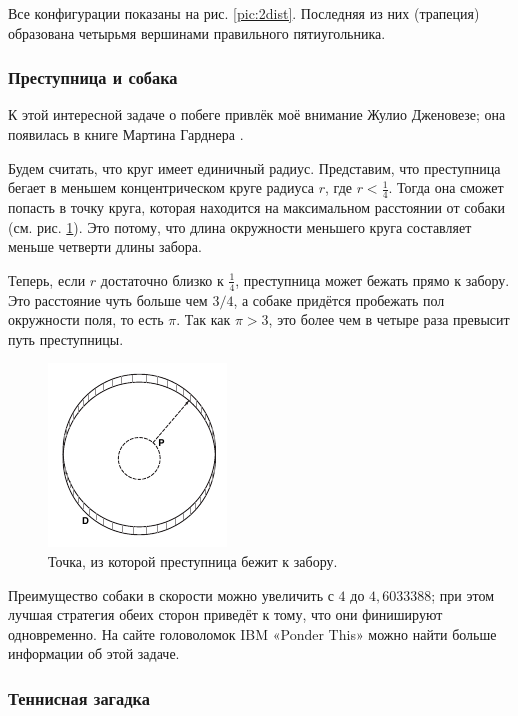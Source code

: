 Все конфигурации показаны на рис. \ref{pic:2dist}.
Последняя из них (трапеция) образована четырьмя вершинами правильного пятиугольника.


\subsubsection*{Преступница и собака}

К этой интересной задаче о побеге привлёк моё внимание Жулио Дженовезе;
она появилась в книге Мартина Гарднера \cite{24}.

Будем считать, что круг имеет единичный радиус.
Представим, что преступница бегает в меньшем концентрическом круге радиуса $r$, где $r < \tfrac14$.
Тогда она сможет попасть в точку круга, которая находится на максимальном расстоянии от собаки (см. рис. \ref{pic:dog}).
Это потому, что длина окружности меньшего круга составляет меньше четверти длины забора.

Теперь, если $r$ достаточно близко к $\tfrac14$, преступница может бежать прямо к забору.
Это расстояние чуть больше чем $3/4$, а собаке придётся пробежать пол окружности поля, то есть $\pi$.
Так как $\pi > 3$, это более чем в четыре раза превысит путь преступницы.

\begin{figure}[h!]
\centering
\includegraphics[scale=1]{pics/dog}
\caption{Точка, из которой преступница бежит к забору.}
\label{pic:dog}
\end{figure}

Преимущество собаки в скорости можно увеличить с $4$ до $4{,}6033388$; при этом лучшая стратегия обеих сторон приведёт к тому, что они финишируют одновременно.
На сайте головоломок IBM «Ponder This» \cite[май 2001]{ponder-this} можно найти больше информации об этой задаче.

\subsubsection*{Теннисная загадка}

